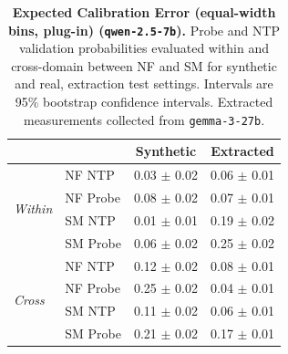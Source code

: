 \begin{table}[ht]
\centering
\begin{tabular}{ll cc}
\toprule
& & Synthetic & Extracted \\
\midrule
\multirow{4}{*}{\textit{Within}}
& NF NTP & 0.03 $\pm$ 0.02 & 0.06 $\pm$ 0.01 \\
& NF Probe & 0.08 $\pm$ 0.02 & 0.07 $\pm$ 0.01 \\
& SM NTP & 0.01 $\pm$ 0.01 & 0.19 $\pm$ 0.02 \\
& SM Probe & 0.06 $\pm$ 0.02 & 0.25 $\pm$ 0.02 \\
\midrule
\multirow{4}{*}{\textit{Cross}}
& NF NTP & 0.12 $\pm$ 0.02 & 0.08 $\pm$ 0.01 \\
& NF Probe & 0.25 $\pm$ 0.02 & 0.04 $\pm$ 0.01 \\
& SM NTP & 0.11 $\pm$ 0.02 & 0.06 $\pm$ 0.01 \\
& SM Probe & 0.21 $\pm$ 0.02 & 0.17 $\pm$ 0.01 \\
\bottomrule
\end{tabular}
\caption{\textbf{Expected Calibration Error (equal-width bins, plug-in) (\texttt{qwen-2.5-7b}).} Probe and NTP validation probabilities evaluated within and cross-domain between NF and SM for synthetic and real, extraction test settings. Intervals are 95\% bootstrap confidence intervals. Extracted measurements collected from \texttt{gemma-3-27b}.}
\label{tab:qwen-2.5-7b-gemma-3-27b-nfix_supermat-ece}
\end{table}
